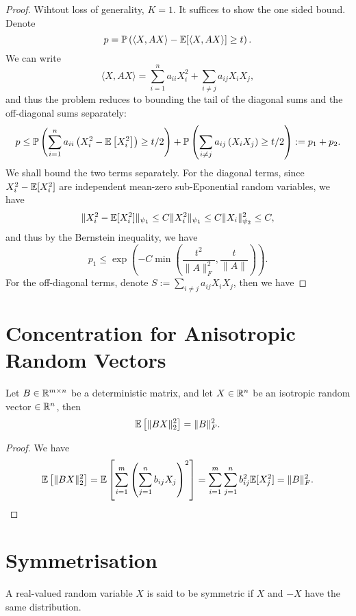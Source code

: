 \begin{proof}
	Wihtout loss of generality, \(K=1\). It suffices to show the one sided bound. Denote
	\begin{equation*}
		p={\mathbb P}\left(\langle X, AX\rangle-{\mathbb E}[\langle X, AX\rangle]\geq t\right).
	\end{equation*}
	We can write
	\begin{equation*}
		\langle X, AX\rangle=\sum_{i=1}^{n}a_{ii}X_{i}^{2}+\sum_{i\neq j}a_{ij}X_{i}X_{j},
	\end{equation*}
	and thus the problem reduces to bounding the tail of the diagonal sums and the off-diagonal sums separately:
	\begin{equation*}
		p\leq{\mathbb P}\left(\sum_{i=1}^{n}a_{ii}\left(X_{i}^{2}-{\mathbb E}\left[X_{i}^{2}\right]\right)\geq t/2\right)+{\mathbb P}\left(\sum_{i\neq j}a_{ij}\left(X_{i}X_{j}\right)\geq t/2\right):=p_{1}+p_{2}.
	\end{equation*}
	We shall bound the two terms separately. For the diagonal terms, since \(X_i^2-{\mathbb E}[X_i^2]\) are independent mean-zero sub-Eponential random variables, we have
	\begin{equation*}
		\|X_{i}^{2}-{\mathbb E}[X_{i}^{2}]\|_{\psi_{1}}\leq C\|X_{i}^{2}\|_{\psi_{1}}\leq C\|X_{i}\|_{\psi_{2}}^{2}\leq C,
	\end{equation*}
	and thus by the Bernstein inequality, we have
	\begin{equation*}
		p_{1}\leq\exp\left(-C\min\left(\frac{t^{2}}{\|A\|_{F}^{2}}, \frac{t}{\|A\|}\right)\right).
	\end{equation*}
	For the off-diagonal terms, denote \(S:=\sum_{i\neq j}a_{ij}X_{i}X_{j}\), then we have
\end{proof}

\section{Concentration for Anisotropic Random Vectors}

\begin{lemma}
	Let \(B\in{\mathbb R}^{m\times n}\) be a deterministic matrix, and let \(X\in{\mathbb R}^{n}\) be an isotropic random vector \(\in{\mathbb R}^{n}\), then
	\begin{equation*}
		{\mathbb E}\left[\|BX\|_{2}^{2}\right]=\|B\|_{F}^{2}.
	\end{equation*}
\end{lemma}

\begin{proof}
	We have
	\begin{equation*}
		{\mathbb E}\left[\|BX\|_{2}^{2}\right]={\mathbb E}\left[\sum_{i=1}^{m}\left(\sum_{j=1}^{n}b_{ij}X_{j}\right)^{2}\right]=\sum_{i=1}^{m}\sum_{j=1}^{n}b_{ij}^{2}{\mathbb E}[X_{j}^{2}]=\|B\|_{F}^{2}.
	\end{equation*}
\end{proof}

\section{Symmetrisation}

\begin{definition}
	A real-valued random variable \(X\) is said to be symmetric if \(X\) and \(-X\) have the same distribution.
\end{definition}